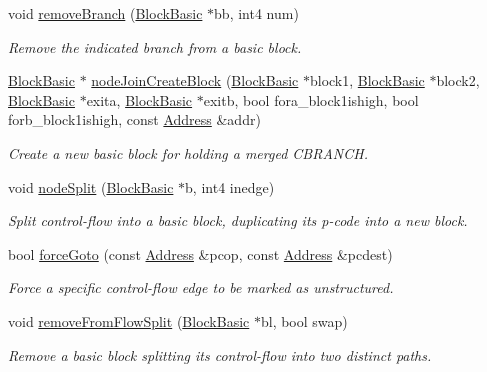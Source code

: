 \begin{DoxyCompactItemize}
void \mbox{\hyperlink{class_funcdata_a3a53162bf9a1756c4f2f4d7d1d7bbcec}{remove\+Branch}} (\mbox{\hyperlink{class_block_basic}{Block\+Basic}} $\ast$bb, int4 num)
\begin{DoxyCompactList}\small\item\em Remove the indicated branch from a basic block. \end{DoxyCompactList}\item 
\mbox{\hyperlink{class_block_basic}{Block\+Basic}} $\ast$ \mbox{\hyperlink{class_funcdata_ad810c24ce5fb16a95de1f7d27c8856d8}{node\+Join\+Create\+Block}} (\mbox{\hyperlink{class_block_basic}{Block\+Basic}} $\ast$block1, \mbox{\hyperlink{class_block_basic}{Block\+Basic}} $\ast$block2, \mbox{\hyperlink{class_block_basic}{Block\+Basic}} $\ast$exita, \mbox{\hyperlink{class_block_basic}{Block\+Basic}} $\ast$exitb, bool fora\+\_\+block1ishigh, bool forb\+\_\+block1ishigh, const \mbox{\hyperlink{class_address}{Address}} \&addr)
\begin{DoxyCompactList}\small\item\em Create a new basic block for holding a merged C\+B\+R\+A\+N\+CH. \end{DoxyCompactList}\item 
void \mbox{\hyperlink{class_funcdata_a3e19baf8aa1db2ecde4fd12075da0694}{node\+Split}} (\mbox{\hyperlink{class_block_basic}{Block\+Basic}} $\ast$b, int4 inedge)
\begin{DoxyCompactList}\small\item\em Split control-\/flow into a basic block, duplicating its p-\/code into a new block. \end{DoxyCompactList}\item 
bool \mbox{\hyperlink{class_funcdata_ac9b35091642dc7527a537d01db5ad7e1}{force\+Goto}} (const \mbox{\hyperlink{class_address}{Address}} \&pcop, const \mbox{\hyperlink{class_address}{Address}} \&pcdest)
\begin{DoxyCompactList}\small\item\em Force a specific control-\/flow edge to be marked as {\itshape unstructured}. \end{DoxyCompactList}\item 
void \mbox{\hyperlink{class_funcdata_af83619924b5d0fed25d0563b0f243262}{remove\+From\+Flow\+Split}} (\mbox{\hyperlink{class_block_basic}{Block\+Basic}} $\ast$bl, bool swap)
\begin{DoxyCompactList}\small\item\em Remove a basic block splitting its control-\/flow into two distinct paths. \end{DoxyCompactList}\item 

\end{DoxyCompactItemize}
